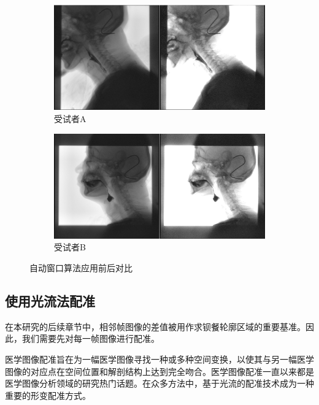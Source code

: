 \begin{figure}[!htp]
    \centering
    \begin{subfigure}{\textwidth}
        \centering
        \includegraphics[width=\textwidth]{figures/2_2_1.png}
        \caption{受试者A}
    \end{subfigure}
    
    \begin{subfigure}{\textwidth}
        \centering
        \includegraphics[width=\textwidth]{figures/2_2_2.png}
        \caption{受试者B}
    \end{subfigure}
    \caption{自动窗口算法应用前后对比}
    \label{fig:2_1_对比}
\end{figure}

\subsection{使用光流法配准}\label{sec:2_2}

在本研究的后续章节中，相邻帧图像的差值被用作求钡餐轮廓区域的重要基准。因此，我们需要先对每一帧图像进行配准。

医学图像配准旨在为一幅医学图像寻找一种或多种空间变换，以使其与另一幅医学图像的对应点在空间位置和解剖结构上达到完全吻合\cite{shi2017}。医学图像配准一直以来都是医学图像分析领域的研究热门话题。在众多方法中，基于光流的配准技术成为一种重要的形变配准方式\cite{ji2017based}。


